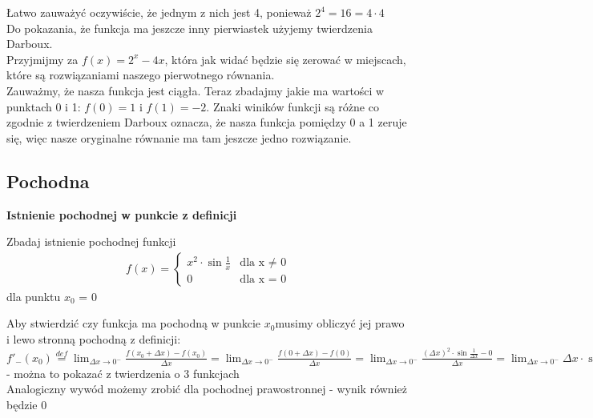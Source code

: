 \documentclass[12pt]{article}
\begin{document}
	\noindent Łatwo zauważyć oczywiście, że jednym z nich jest 4, ponieważ $2^4 = 16 = 4 \cdot 4$ \\

	\noindent Do pokazania, że funkcja ma jeszcze inny pierwiastek użyjemy twierdzenia Darboux. \\
	Przyjmijmy za $f(x) = 2^x - 4x$, która jak widać będzie się zerować w miejscach, które są rozwiązaniami naszego pierwotnego równania. \\
	Zauważmy, że nasza funkcja jest ciągła. Teraz zbadajmy jakie ma wartości w punktach 0 i 1: $f(0) = 1$ i $f(1) = -2$. Znaki winików funkcji są różne co zgodnie z twierdzeniem Darboux oznacza,
	że nasza funkcja pomiędzy 0 a 1 zeruje się, więc nasze oryginalne równanie ma tam jeszcze jedno rozwiązanie.


    \subsection{Pochodna}

    \textbf{Istnienie pochodnej w punkcie z definicji} \\

    \begin{exercise}
		Zbadaj istnienie pochodnej funkcji
		\begin{align*}
         		f(x) =
              \begin{cases}
              	x^2 \cdot \sin{\frac{1}{x}} & \text{dla x $\neq$ 0} \\
                   0 & \text{dla x = 0}
			\end{cases}
		\end{align*}
    		dla punktu $x_{0}$ = 0
	\end{exercise}

    \noindent Aby stwierdzić czy funkcja ma pochodną w punkcie $x_{0}$musimy obliczyć jej prawo i lewo stronną pochodną z definicji: \\

    \noindent $f'_{-}(x_{0}) \stackrel{def}{=} \lim_{\Delta x \to 0^{-}} \frac{f(x_{0} + \Delta x) - f(x_{0})}{\Delta x} = \lim_{\Delta x \to 0^{-}} \frac{f(0 + \Delta x) - f(0)}{\Delta x} = \lim_{\Delta x \to 0^{-}} \frac{(\Delta x)^2 \cdot \sin{\frac{1}{\Delta x}} - 0}{\Delta x} =
 \lim_{\Delta x \to 0^{-}} \Delta x \cdot \sin{\frac{1}{\Delta x}} = 0$ - można to pokazać z twierdzenia o 3 funkcjach \\

    \noindent Analogiczny wywód możemy zrobić dla pochodnej prawostronnej - wynik również będzie 0 \\
\end{document}
